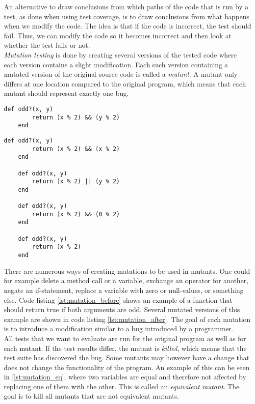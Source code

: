 An alternative to draw conclusions from which paths of the code that is
run by a test, as done when using test coverage, is to draw conclusions
from what happens when we modify the code. The idea is that if the code
is incorrect, the test should fail. Thus, we can modify the code so it
becomes incorrect and then look at whether the test fails or not.\\

\emph{Mutation testing} is done by creating several versions of the
tested code where each version contains a slight modification. Each such
version containing a mutated version of the original source code is
called a \emph{mutant}. A mutant only differs at one location compared
to the original program, which means that each mutant should represent
exactly one bug. \cite{article:mutation, wiki:mutation}\\

\begin{lstlisting}[caption=Example of a piece of code before mutation.,
                   label=lst:mutation_before, float=t]
    def odd?(x, y)
        return (x % 2) && (y % 2)
    end
\end{lstlisting}


\begin{lstlisting}[caption=Mutated versions of code listing \ref{lst:mutation_before}.,
                   label=lst:mutation_after, float=t]
    def odd?(x, y)
        return (x % 2) && (x % 2)
    end

    def odd?(x, y)
        return (x % 2) || (y % 2)
    end

    def odd?(x, y)
        return (x % 2) && (0 % 2)
    end

    def odd?(x, y)
        return (x % 2)
    end
\end{lstlisting}

There are numerous ways of creating mutations to be used in mutants. One
could for example delete a method call or a variable, exchange an
operator for another, negate an if-statement, replace a variable with
zero or null-values, or something else. Code listing
\ref{lst:mutation_before} shows an example of a function that should
return true if both arguments are odd. Several mutated versions of this
example are shown in code listing \ref{lst:mutation_after}. The goal of
each mutation is to introduce a modification similar to a bug introduced
by a programmer. \cite{article:mutation}\\

All tests that we want to evaluate are run for the original program as
well as for each mutant. If the test results differ, the mutant is
\emph{killed}, which means that the test suite has discovered the bug.
Some mutants may however have a change that does not change the
functionality of the program. An example of this can be seen in
\ref{lst:mutation_eq}, where two variables are equal and therefore not
affected by replacing one of them with the other. This is called an
\emph{equivalent mutant}. The goal is to kill all mutants that are not
equivalent mutants. \cite{article:mutation, wiki:mutation}\\

